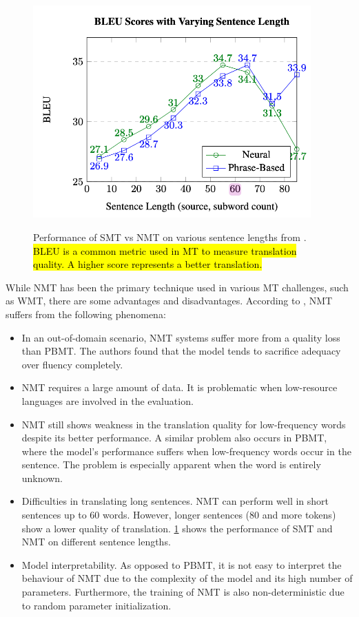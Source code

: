 \begin{figure}[h]
    {\includegraphics[width=0.95\textwidth]{img/bleusentencelength.png}}
    \centering
    \caption{Performance of SMT vs NMT on various sentence lengths from . \hl{BLEU is a common metric used in MT to measure translation quality. A higher score represents a better translation.}}
    \label{img:bleusentlength}
\end{figure}


While NMT has been the primary technique used in various MT challenges, such as WMT, there are some advantages and disadvantages. According to , NMT suffers from the following phenomena:
\begin{itemize}
    \item In an out-of-domain scenario, NMT systems suffer more from a quality loss than PBMT. The authors found that the model tends to sacrifice adequacy over fluency completely.

    \item NMT requires a large amount of data. It is problematic when low-resource languages are involved in the evaluation.

    \item NMT still shows weakness in the translation quality for low-frequency words despite its better performance. A similar problem also occurs in PBMT, where the model's performance suffers when low-frequency words occur in the sentence. The problem is especially apparent when the word is entirely unknown.

    \item Difficulties in translating long sentences. NMT can perform well in short sentences up to 60 words. However, longer sentences (80 and more tokens) show a lower quality of translation. \cref{img:bleusentlength} shows the performance of SMT and NMT on different sentence lengths.

    \item Model interpretability. As opposed to PBMT, it is not easy to interpret the behaviour of NMT due to the complexity of the model and its high number of parameters. Furthermore, the training of NMT is also non-deterministic due to random parameter initialization.
\end{itemize}

